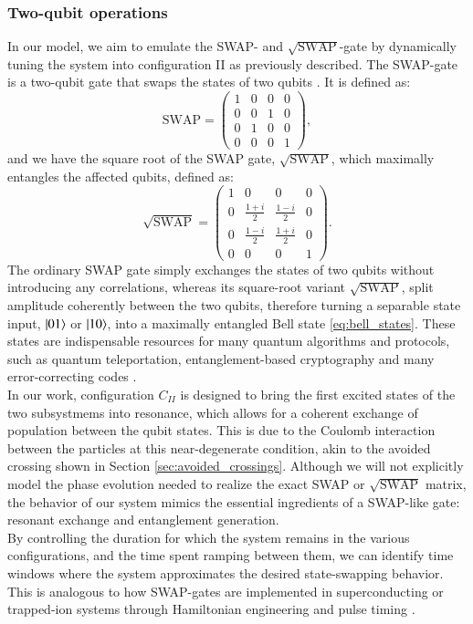 \documentclass{subfiles}
\begin{document}
\subsubsection*{Two-qubit operations}
In our model, we aim to emulate the SWAP- and $\sqrt{\text{SWAP}}$-gate by dynamically tuning the system into configuration II as previously described. The SWAP-gate is a two-qubit gate that swaps the states of two qubits \cite{nielsen2010quantum}. It is defined as:
\begin{equation}
    \text{SWAP} = \begin{pmatrix}
    1 & 0 & 0 & 0 \\
    0 & 0 & 1 & 0 \\
    0 & 1 & 0 & 0 \\
    0 & 0 & 0 & 1
    \end{pmatrix} \label{eq:swap_gate},
\end{equation}
and we have the square root of the SWAP gate, $\sqrt{\text{SWAP}}$, which maximally entangles the affected qubits, defined as:
\begin{equation}
    \sqrt{\text{SWAP}} = \begin{pmatrix}
    1 & 0 & 0 & 0 \\
    0 & \frac{1+i}{2} & \frac{1-i}{2} & 0 \\
    0 & \frac{1-i}{2} & \frac{1+i}{2} & 0 \\
    0 & 0 & 0 & 1
    \end{pmatrix} \label{eq:sqrt_swap_gate}.
\end{equation}
The ordinary SWAP gate simply exchanges the states of two qubits without introducing any correlations, whereas its square-root variant $\sqrt{\text{SWAP}}$, split amplitude coherently between the two qubits, therefore turning a separable state input, $\ket{01}$ or $\ket{10}$, into a maximally entangled Bell state \eqref{eq:bell_states}. These states are indispensable resources for many quantum algorithms and protocols, such as quantum teleportation, entanglement-based cryptography and many error-correcting codes \cite{nielsen2010quantum, bouwmeester1997experimental, yin2020entanglement}. 
\\
In our work, configuration $C_{II}$ is designed to bring the first excited states of the two subsystmems into resonance, which allows for a coherent exchange of population between the qubit states. This is due to the Coulomb interaction between the particles at this near-degenerate condition, akin to the avoided crossing shown in Section \ref{sec:avoided_crossings}. Although we will not explicitly model the phase evolution needed to realize the exact SWAP or $\sqrt{\text{SWAP}}$ matrix, the behavior of our system mimics the essential ingredients of a SWAP-like gate: resonant exchange and entanglement generation. \\
By controlling the duration for which the system remains in the various configurations, and the time spent ramping between them, we can identify time windows where the system approximates the desired state-swapping behavior. This is analogous to how SWAP-gates are implemented in superconducting or trapped-ion systems through Hamiltonian engineering and pulse timing \cite{picard2025entanglement}. \\
\end{document}
